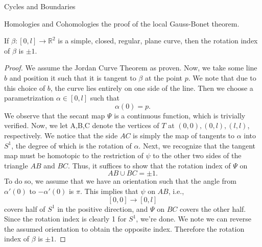 \begin{subsubsection}{Cycles and Boundaries}
\begin{subsubsection}{Homologies and Cohomologies}
the proof of the local Gauss-Bonet theorem.
\begin{theorem}
  If $\beta:\left[0,l\right]\rightarrow \mathbb{R}^2$ is a simple, closed,
  regular, plane curve, then the rotation index of $\beta$ is $\pm 1$.
\end{theorem}
\begin{proof}
  We assume the Jordan Curve Theorem as proven. Now, we take some line $b$ and 
  position it such that it is tangent to $\beta$ at the point $p$. We note that
  due to this choice of $b$, the curve lies entirely on one side of the line.
  Then we choose a parametrization $\alpha\in \left[0,l\right]$ such that
  \begin{equation}
    \alpha(0) = p.
  \end{equation}
  We observe that the secant map $\Psi$ is a continuous function, which is 
  trivially verified. Now, we let A,B,C denote the vertices of $T$ at
  $(0,0),(0,l),(l,l)$, respectively. We notice that the side $AC$ is simply
  the map of tangents to $\alpha$ into $S^1$, the degree of which is the
  rotation of $\alpha$. Next, we recognize that the tangent map must be
  homotopic to the restriction of $\psi$ to the other two sides of the
  triangle $AB$ and $BC$. Thus, it suffices to show that the rotation
  index of $\Psi$ on
  \begin{equation}
    AB\cup BC = \pm 1.
  \end{equation}
  To do so, we assume that we have an orientation such that the angle from
  $\alpha'(0)$ to $-\alpha'(0)$ is $\pi$. This implies that $\psi$ on $AB$,
  i.e.,
  \begin{equation}
    \left[0,0\right]\rightarrow\left[0,l\right]
  \end{equation}
  covers half of $S^1$ in the positive direction, and $\Psi$ on $BC$ covers
  the other half. Since the rotation index is clearly 1 for $S^1$, we're done.
  We note we can reverse the assumed orientation to obtain the opposite index.
  Therefore the rotation index of $\beta$ is $\pm 1$.
\end{proof}

\end{subsubsection}
\end{subsubsection}
